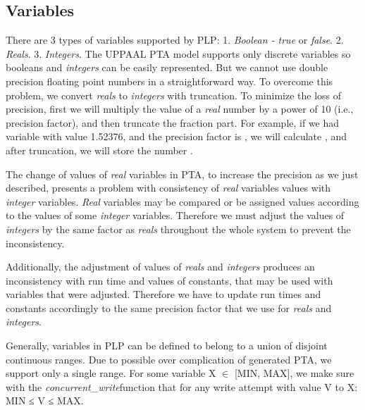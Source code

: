\subsection{Variables}
There are 3 types of variables supported by PLP: 1. \textit{Boolean - true} or \textit{false}. 2. \textit{\textit{Reals}}. 3. \textit{\textit{Integers}}. The UPPAAL PTA model supports only discrete variables so booleans and \textit{integers} can be easily represented. But we cannot use double precision floating point numbers in a straightforward way. To overcome this problem, we convert \textit{reals} to \textit{integers} with truncation. To minimize the loss of precision, first we will multiply the value of a \textit{real} number by a power of 10 (i.e., precision factor), and then truncate the fraction part. For example, if we had variable with value 1.52376, and the precision factor is , we will calculate , and after truncation, we will store the number . 
\par The change of values of \textit{real} variables in PTA, to increase the precision as we just described, presents a problem with consistency of \textit{real} variables values with \textit{integer} variables. \textit{Real} variables may be compared or be assigned values according to the values of some \textit{integer} variables. Therefore we must adjust the values of \textit{integers} by the same factor as \textit{reals} throughout the whole system to prevent the inconsistency. 
\par Additionally, the adjustment of values of \textit{reals} and \textit{integers} produces an inconsistency with run time and values of constants, that may be used with variables that were adjusted. Therefore we have to update run times and constants accordingly to the same precision factor that we use for \textit{reals} and \textit{integers}. 
\par Generally, variables in PLP can be defined to belong to a union of disjoint continuous ranges. Due to possible over complication of generated PTA, we support only a single range. For some variable X $\in$ \small[MIN, MAX\small], we make sure with the \textcolor{ColorUppaalFunction}{\textit{concurrent_write}}​ function that for any write attempt with value V to X: MIN ≤ V ≤ MAX.\\
